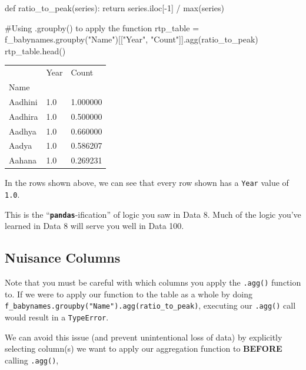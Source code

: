 \documentclass[
  letterpaper,
  DIV=11,
  numbers=noendperiod]{scrreprt}
\newenvironment{Shaded}{\begin{snugshade}}{\end{snugshade}}
\newcommand{\BuiltInTok}[1]{\textcolor[rgb]{0.00,0.23,0.31}{#1}}
\newcommand{\CommentTok}[1]{\textcolor[rgb]{0.37,0.37,0.37}{#1}}
\newcommand{\ControlFlowTok}[1]{\textcolor[rgb]{0.00,0.23,0.31}{#1}}
\newcommand{\DecValTok}[1]{\textcolor[rgb]{0.68,0.00,0.00}{#1}}
\newcommand{\KeywordTok}[1]{\textcolor[rgb]{0.00,0.23,0.31}{#1}}
\newcommand{\NormalTok}[1]{\textcolor[rgb]{0.00,0.23,0.31}{#1}}
\newcommand{\OperatorTok}[1]{\textcolor[rgb]{0.37,0.37,0.37}{#1}}
\newcommand{\StringTok}[1]{\textcolor[rgb]{0.13,0.47,0.30}{#1}}
\begin{document}
\begin{Shaded}
\begin{Highlighting}[]
\KeywordTok{def}\NormalTok{ ratio\_to\_peak(series):}
    \ControlFlowTok{return}\NormalTok{ series.iloc[}\OperatorTok{{-}}\DecValTok{1}\NormalTok{] }\OperatorTok{/} \BuiltInTok{max}\NormalTok{(series)}

\CommentTok{\#Using .groupby() to apply the function}
\NormalTok{rtp\_table }\OperatorTok{=}\NormalTok{ f\_babynames.groupby(}\StringTok{"Name"}\NormalTok{)[[}\StringTok{"Year"}\NormalTok{, }\StringTok{"Count"}\NormalTok{]].agg(ratio\_to\_peak)}
\NormalTok{rtp\_table.head()}
\end{Highlighting}
\end{Shaded}

\begin{longtable}[]{@{}lll@{}}
\toprule\noalign{}
& Year & Count \\
Name & & \\
\midrule\noalign{}
\endhead
\bottomrule\noalign{}
\endlastfoot
Aadhini & 1.0 & 1.000000 \\
Aadhira & 1.0 & 0.500000 \\
Aadhya & 1.0 & 0.660000 \\
Aadya & 1.0 & 0.586207 \\
Aahana & 1.0 & 0.269231 \\
\end{longtable}

In the rows shown above, we can see that every row shown has a
\texttt{Year} value of \texttt{1.0}.

This is the ``\textbf{\texttt{pandas}}-ification'' of logic you saw in
Data 8. Much of the logic you've learned in Data 8 will serve you well
in Data 100.

\subsection{Nuisance Columns}\label{nuisance-columns}

Note that you must be careful with which columns you apply the
\texttt{.agg()} function to. If we were to apply our function to the
table as a whole by doing
\texttt{f\_babynames.groupby("Name").agg(ratio\_to\_peak)}, executing
our \texttt{.agg()} call would result in a \texttt{TypeError}.

We can avoid this issue (and prevent unintentional loss of data) by
explicitly selecting column(s) we want to apply our aggregation function
to \textbf{BEFORE} calling \texttt{.agg()},
\end{document}
